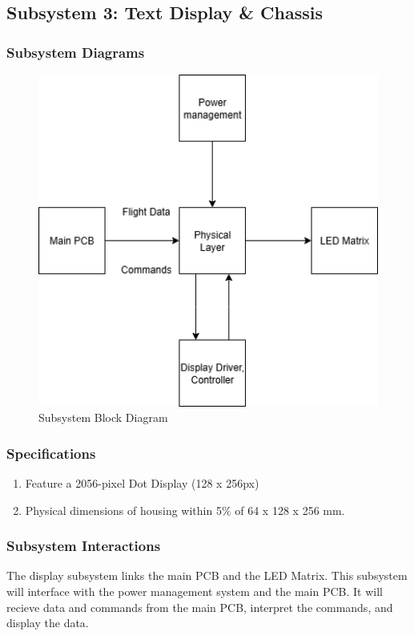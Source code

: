 \subsection{Subsystem 3: Text Display \& Chassis}
\subsubsection{Subsystem Diagrams}
\begin{figure}[h]
    \centering
    \includegraphics[width=12cm]{images/DisplayDriver/blockDiagram-display.png} %
    \caption{Subsystem Block Diagram}
\end{figure} %

\subsubsection{Specifications}
\begin{enumerate}
    \item Feature a 2056-pixel Dot Display (128 x 256px)
    \item Physical dimensions of housing within 5\% of 64 x 128 x 256 mm.
\end{enumerate}

\subsubsection{Subsystem Interactions}
The display subsystem links the main PCB and the LED Matrix. This subsystem will interface with the power management system and the main PCB. It will recieve data and commands from the main PCB, interpret the commands, and display the data.

